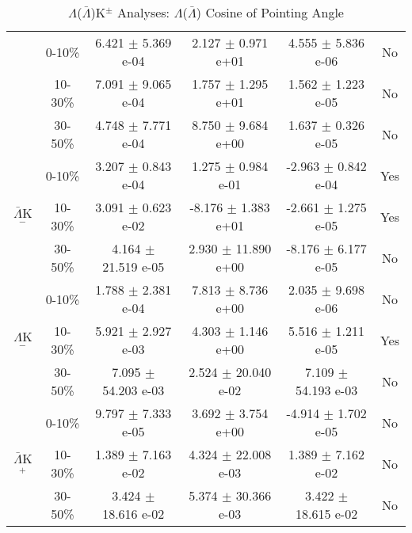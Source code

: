 \documentclass[../AnalysisNoteJBuxton.tex]{subfiles}
\begin{document}
\begin{table}
\begin{tabular}{|c|c|c|c|c|c|}
   &  0-10\% & 6.421 $\pm$ 5.369 e-04 & 2.127 $\pm$ 0.971 e+01 & 4.555 $\pm$ 5.836 e-06 & No \\
   & 10-30\% & 7.091 $\pm$ 9.065 e-04 & 1.757 $\pm$ 1.295 e+01 & 1.562 $\pm$ 1.223 e-05 & No \\
   & 30-50\% & 4.748 $\pm$ 7.771 e-04 & 8.750 $\pm$ 9.684 e+00 & 1.637 $\pm$ 0.326 e-05 & No \\
  \hline  
  \multirow{3}{*}{$\bar{\Lambda}$K$^{-}$}
   & 0-10\% & 3.207 $\pm$ 0.843 e-04 & 1.275 $\pm$ 0.984 e-01 & -2.963 $\pm$ 0.842 e-04 & Yes \\
   & 10-30\% & 3.091 $\pm$ 0.623 e-02 & -8.176 $\pm$ 1.383 e+01 & -2.661 $\pm$ 1.275 e-05 & Yes \\
   & 30-50\% & 4.164 $\pm$ 21.519 e-05 & 2.930 $\pm$ 11.890 e+00 & -8.176 $\pm$ 6.177 e-05 & No \\
  \hline \hline
  \multirow{3}{*}{$\Lambda$K$^{-}$}   
   &  0-10\% & 1.788 $\pm$ 2.381 e-04 & 7.813 $\pm$ 8.736 e+00 & 2.035 $\pm$ 9.698 e-06 & No \\
   & 10-30\% & 5.921 $\pm$ 2.927 e-03 & 4.303 $\pm$ 1.146 e+00 & 5.516 $\pm$ 1.211 e-05 & Yes \\
   & 30-50\% & 7.095 $\pm$ 54.203 e-03 & 2.524 $\pm$ 20.040 e-02 & 7.109 $\pm$ 54.193 e-03 & No \\
  \hline  
  \multirow{3}{*}{$\bar{\Lambda}$K$^{+}$}
   & 0-10\% & 9.797 $\pm$ 7.333 e-05 & 3.692 $\pm$ 3.754 e+00 & -4.914 $\pm$ 1.702 e-05 & No \\
   & 10-30\% & 1.389 $\pm$ 7.163 e-02 & 4.324 $\pm$ 22.008 e-03 & 1.389 $\pm$ 7.162 e-02 & No \\
   & 30-50\% & 3.424 $\pm$ 18.616 e-02 & 5.374 $\pm$ 30.366 e-03 & 3.422 $\pm$ 18.615 e-02 & No \\  
  \hline
 \end{tabular}
 \caption{$\Lambda$($\bar{\Lambda}$)K$^{\pm}$ Analyses: $\Lambda$($\bar{\Lambda}$) Cosine of Pointing Angle}
 \label{tab:LamCosPointingAngleLamKchFull}
\end{table}
\end{document}
